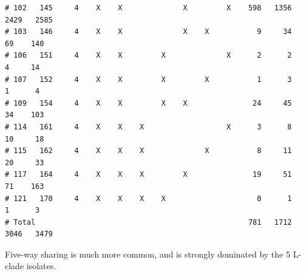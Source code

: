 \documentclass{article}\usepackage[]{graphicx}\usepackage[]{color}
\makeatletter
\newenvironment{kframe}{%
 \def\at@end@of@kframe{}%
 \ifinner\ifhmode%
  \def\at@end@of@kframe{\end{minipage}}%
  \begin{minipage}{\columnwidth}%
 \fi\fi%
 \def\FrameCommand##1{\hskip\@totalleftmargin \hskip-\fboxsep
 \colorbox{shadecolor}{##1}\hskip-\fboxsep
     \hskip-\linewidth \hskip-\@totalleftmargin \hskip\columnwidth}%
 \MakeFramed {\advance\hsize-\width
   \@totalleftmargin\z@ \linewidth\hsize
   \@setminipage}}%
 {\par\unskip\endMakeFramed%
 \at@end@of@kframe}
\newenvironment{knitrout}{}{} %
\makeatother
\begin{document}
\begin{knitrout}
\begin{kframe}
\begin{verbatim}
# 102   145     4    X    X              X         X    598   1356   2429   2585
# 103   146     4    X    X              X    X           9     34     69    140
# 106   151     4    X    X         X              X      2      2      4     14
# 107   152     4    X    X         X         X           1      3      1      4
# 109   154     4    X    X         X    X               24     45     34    103
# 114   161     4    X    X    X                   X      3      8     10     18
# 115   162     4    X    X    X              X           8     11     20     33
# 117   164     4    X    X    X         X               19     51     71    163
# 121   170     4    X    X    X    X                     0      1      1      3
# Total                                                 781   1712   3046   3479
\end{verbatim}
\end{kframe}
\end{knitrout}

Five-way sharing is much more common, and is strongly dominated by the 5 L-clade isolates.
\end{document}
